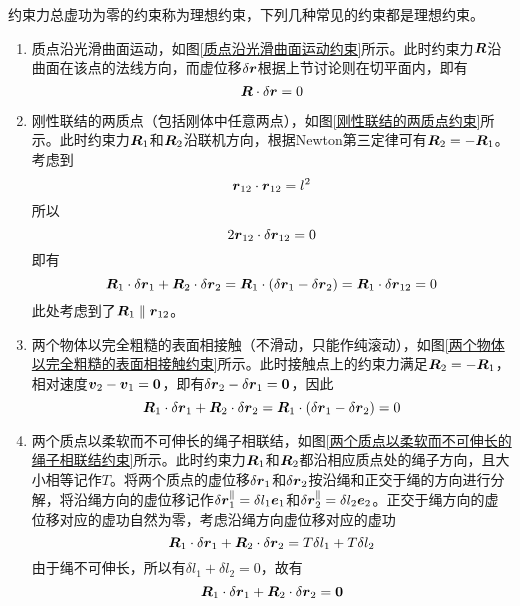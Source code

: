 约束力总虚功为零的约束称为{\heiti 理想约束}，下列几种常见的约束都是理想约束。
\begin{enumerate}
	\item 质点沿光滑曲面运动，如图\ref{质点沿光滑曲面运动约束}所示。此时约束力$\boldsymbol{R}$沿曲面在该点的法线方向，而虚位移$\delta \boldsymbol{r}$根据上节讨论则在切平面内，即有
	\begin{equation*}
		\boldsymbol{R} \cdot \delta \boldsymbol{r} = 0
	\end{equation*}
	\item 刚性联结的两质点（包括刚体中任意两点），如图\ref{刚性联结的两质点约束}所示。此时约束力$\boldsymbol{R}_1$和$\boldsymbol{R}_2$沿联机方向，根据Newton第三定律可有$\boldsymbol{R}_2=-\boldsymbol{R}_1$。考虑到
	\begin{equation*}
		\boldsymbol{r}_{12} \cdot \boldsymbol{r}_{12} = l^2
	\end{equation*}
	所以
	\begin{equation*}
		2\boldsymbol{r}_{12} \cdot \delta \boldsymbol{r}_{12} = 0
	\end{equation*}
	即有
	\begin{equation*}
		\boldsymbol{R}_1 \cdot \delta \boldsymbol{r}_1 + \boldsymbol{R}_2 \cdot \delta \boldsymbol{r}_2 = \boldsymbol{R}_1 \cdot (\delta \boldsymbol{r}_1 - \delta \boldsymbol{r}_2) = \boldsymbol{R}_1 \cdot \delta \boldsymbol{r}_{12} = 0
	\end{equation*}
	此处考虑到了$\boldsymbol{R}_1 \parallel \boldsymbol{r}_{12}$。
	\item 两个物体以完全粗糙的表面相接触（不滑动，只能作纯滚动），如图\ref{两个物体以完全粗糙的表面相接触约束}所示。此时接触点上的约束力满足$\boldsymbol{R}_2 =- \boldsymbol{R}_1$，相对速度$\boldsymbol{v}_2-\boldsymbol{v}_1= \boldsymbol{0}$，即有$\delta \boldsymbol{r}_2-\delta \boldsymbol{r}_1 = \boldsymbol{0}$，因此
	\begin{equation*}
		\boldsymbol{R}_1 \cdot \delta \boldsymbol{r}_1 + \boldsymbol{R}_2 \cdot \delta \boldsymbol{r}_2 = \boldsymbol{R}_1 \cdot (\delta \boldsymbol{r}_1 - \delta \boldsymbol{r}_2) = 0
	\end{equation*}
	\item 两个质点以柔软而不可伸长的绳子相联结，如图\ref{两个质点以柔软而不可伸长的绳子相联结约束}所示。此时约束力$\boldsymbol{R}_1$和$\boldsymbol{R}_2$都沿相应质点处的绳子方向，且大小相等记作$T$。将两个质点的虚位移$\delta \boldsymbol{r}_1$和$\delta \boldsymbol{r}_2$按沿绳和正交于绳的方向进行分解，将沿绳方向的虚位移记作$\delta \boldsymbol{r}_1^\parallel = \delta l_1\boldsymbol{e}_1$和$\delta \boldsymbol{r}_2^\parallel = \delta l_2 \boldsymbol{e}_2$。正交于绳方向的虚位移对应的虚功自然为零，考虑沿绳方向虚位移对应的虚功
	\begin{equation*}
		\boldsymbol{R}_1 \cdot \delta \boldsymbol{r}_1 + \boldsymbol{R}_2 \cdot \delta \boldsymbol{r}_2 = T\delta l_1 + T\delta l_2
	\end{equation*}
	由于绳不可伸长，所以有$\delta l_1 + \delta l_2 = 0$，故有
	\begin{equation*}
		\boldsymbol{R}_1 \cdot \delta \boldsymbol{r}_1 + \boldsymbol{R}_2 \cdot \delta \boldsymbol{r}_2 = \boldsymbol{0}
	\end{equation*}
\end{enumerate}
